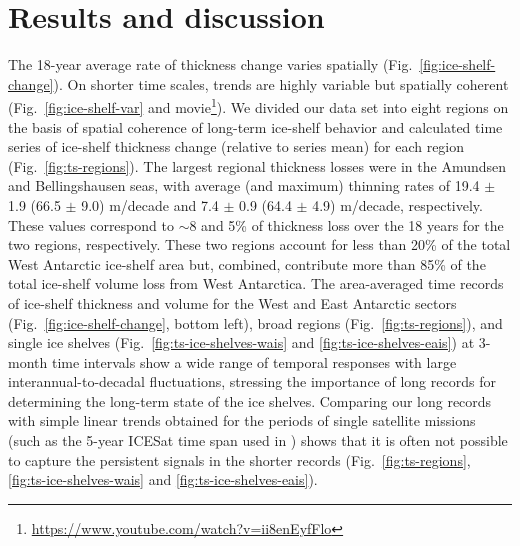 \section{Results and discussion}

The 18-year average rate of thickness change varies spatially (Fig.~\ref{fig:ice-shelf-change}).
On shorter time scales, trends are highly variable but spatially coherent
(Fig.~\ref{fig:ice-shelf-var} and movie\footnote{\url{https://www.youtube.com/watch?v=ii8enEyfFlo}}). We divided our data set into eight regions on the basis of spatial coherence of long-term
ice-shelf behavior and calculated time series of ice-shelf thickness change
(relative to series mean) for each region (Fig.~\ref{fig:ts-regions}). The largest regional
thickness losses were in the Amundsen and Bellingshausen seas, with average
(and maximum) thinning rates of 19.4 $\pm$ 1.9 (66.5 $\pm$ 9.0) m/decade and
7.4 $\pm$ 0.9 (64.4 $\pm$ 4.9) m/decade, respectively. These values correspond
to $\sim$8 and 5\% of thickness loss over the 18 years for the two regions,
respectively. These two regions account for less than 20\% of the total West
Antarctic ice-shelf area but, combined, contribute more than 85\% of the total
ice-shelf volume loss from West Antarctica. The area-averaged time records of
ice-shelf thickness and volume for the West and East Antarctic sectors 
(Fig.~\ref{fig:ice-shelf-change}, bottom left), broad regions (Fig.~\ref{fig:ts-regions}), and single ice
shelves (Fig.~\ref{fig:ts-ice-shelves-wais} and \ref{fig:ts-ice-shelves-eais}) at 3-month time intervals show a wide range of
temporal responses with large interannual-to-decadal fluctuations, stressing
the importance of long records for determining the long-term state of the ice
shelves. Comparing our long records with simple linear trends obtained for the
periods of single satellite missions (such as the 5-year ICESat time span used
in \textcite{Pritchard2012}) shows that it is often not possible to capture the
persistent signals in the shorter records (Fig.~\ref{fig:ts-regions}, \ref{fig:ts-ice-shelves-wais} and \ref{fig:ts-ice-shelves-eais}).


